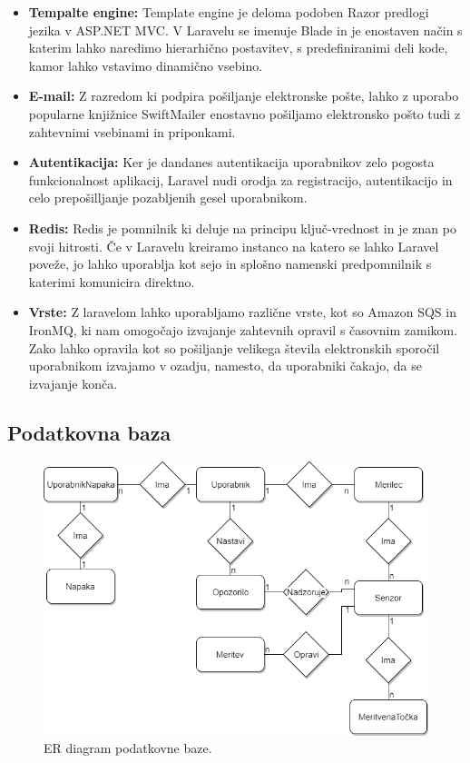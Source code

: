 \documentclass[12pt,a4paper,titlepage,openany]{report}
\begin{document}
\begin{itemize}
\item \textbf{Tempalte engine:}
Template engine je deloma podoben Razor predlogi jezika v ASP.NET MVC. V Laravelu se imenuje Blade in je enostaven način s katerim lahko naredimo hierarhično postavitev, s predefiniranimi deli kode, kamor lahko vstavimo dinamično vsebino.

\item \textbf{E-mail:}
Z razredom ki podpira pošiljanje elektronske pošte, lahko z uporabo popularne knjižnice SwiftMailer enostavno pošiljamo elektronsko pošto tudi z zahtevnimi vsebinami in priponkami.

\item \textbf{Autentikacija:}
Ker je dandanes autentikacija uporabnikov zelo pogosta funkcionalnost aplikacij, Laravel nudi orodja za registracijo, autentikacijo in celo prepošilljanje pozabljenih gesel uporabnikom.

\item \textbf{Redis:}
Redis je pomnilnik ki deluje na principu ključ-vrednost in je znan po svoji hitrosti. Če v Laravelu kreiramo instanco na katero se lahko Laravel poveže, jo lahko uporablja kot sejo in splošno namenski predpomnilnik s katerimi komunicira direktno.

\item \textbf{Vrste:}
Z laravelom lahko uporabljamo različne vrste, kot so Amazon SQS in IronMQ, ki nam omogočajo izvajanje zahtevnih opravil s časovnim zamikom. Zako lahko opravila kot so pošiljanje velikega števila elektronskih sporočil uporabnikom izvajamo v ozadju, namesto, da uporabniki čakajo, da se izvajanje konča.
\end{itemize}

\subsection{Podatkovna baza}



\begin{figure}[H]
\begin{center}
\includegraphics[width=1\linewidth]{Slike/ER.png}
\end{center}
\caption{ER diagram podatkovne baze.}\label{slika:ER}
\end{figure}
\end{document}
